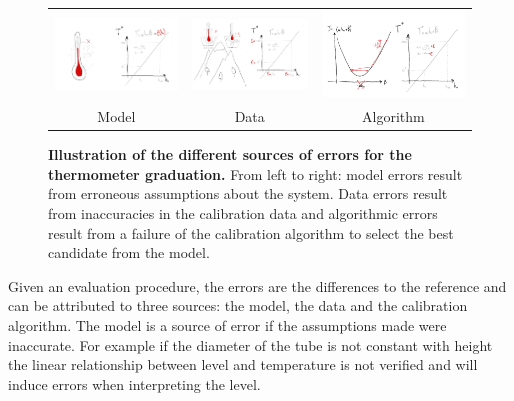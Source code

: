 \begin{bibunit}
\begin{figure}
\begin{tabular}{c|c|c}
     \hspace{-.15\linewidth}\includegraphics[width=.4\linewidth]{Introduction/pics/model_err_w_source.png}  &
     \includegraphics[width=.4\linewidth]{Introduction/pics/data_err_w_source.png} &
     \includegraphics[width=.4\linewidth]{Introduction/pics/optim_err_w_source.png} \\
     \hspace{-.15\linewidth}Model &  Data &  Algorithm \\
\end{tabular}
    \centering
    \caption{\textbf{Illustration of the different sources of errors for the thermometer graduation.} From left to right: model errors result from erroneous assumptions about the system. Data errors result from inaccuracies in the calibration data and algorithmic errors result from a failure of the calibration algorithm to select the best candidate from the model.}
    \label{fig:err_sources}
\end{figure}
Given an evaluation procedure, the errors are the differences to the reference and can be attributed to three sources: the model, the data and the calibration algorithm.
 The model is a source of error if the assumptions made were inaccurate. For example if the diameter of the tube is not constant with height the linear relationship between level and temperature is not verified and will induce errors when interpreting the level.


\end{bibunit}
